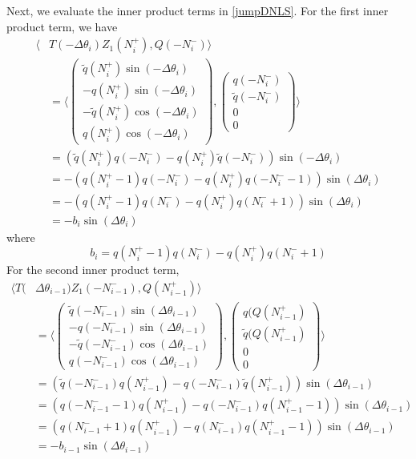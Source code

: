 \documentclass[12pt]{article}
\begin{document}
Next, we evaluate the inner product terms in \eqref{jumpDNLS}. For the first inner product term, we have
\begin{align*}
\langle &T(-\Delta\theta_i) Z_1(N_i^+), Q(-N_i^-) \rangle \\
&= \langle 
\begin{pmatrix}
\tilde{q}(N_i^+)\sin(-\Delta\theta_i) \\
-q(N_i^+)\sin(-\Delta\theta_i) \\ 
-\tilde{q}(N_i^+)\cos(-\Delta\theta_i) \\
q(N_i^+)\cos(-\Delta\theta_i)
\end{pmatrix},
\begin{pmatrix}
q(-N_i^-) \\ \tilde{q}(-N_i^-) \\ 0 \\ 0 
\end{pmatrix}
\rangle \\
&= (\tilde{q}(N_i^+)q(-N_i^-) - q(N_i^+)\tilde{q}(-N_i^-))\sin(-\Delta\theta_i) \\
&= -(q(N_i^+ - 1)q(-N_i^-) - q(N_i^+)q(-N_i^- - 1))\sin(\Delta\theta_i) \\
&= -(q(N_i^+ - 1)q(N_i^-) - q(N_i^+)q(N_i^- + 1))\sin(\Delta\theta_i) \\
&= -b_i \sin(\Delta\theta_i) 
\end{align*}
where 
\[
b_i = q(N_i^+ - 1)q(N_i^-) - q(N_i^+)q(N_i^- + 1)
\]
For the second inner product term,
\begin{align*}
\langle T(&\Delta\theta_{i-1}) Z_1(-N_{i-1}^-), Q(N_{i-1}^+) \rangle \\
&= \langle 
\begin{pmatrix}
\tilde{q}(-N_{i-1}^-)\sin(\Delta\theta_{i-1}) \\
-q(-N_{i-1}^-)\sin(\Delta\theta_{i-1}) \\ 
-\tilde{q}(-N_{i-1}^-)\cos(\Delta\theta_{i-1}) \\
q(-N_{i-1}^-)\cos(\Delta\theta_{i-1})
\end{pmatrix},
\begin{pmatrix}
q(Q(N_{i-1}^+) \\ \tilde{q}(Q(N_{i-1}^+) \\ 0 \\ 0 
\end{pmatrix}
\rangle \\
&= (\tilde{q}(-N_{i-1}^-)q(N_{i-1}^+) - q(-N_{i-1}^-)\tilde{q}(N_{i-1}^+))\sin(\Delta\theta_{i-1}) \\
&= (q(-N_{i-1}^- - 1)q(N_{i-1}^+) - q(-N_{i-1}^-)q(N_{i-1}^+ - 1))\sin(\Delta\theta_{i-1}) \\
&= (q(N_{i-1}^- + 1)q(N_{i-1}^+) - q(N_{i-1}^-)q(N_{i-1}^+ - 1))\sin(\Delta\theta_{i-1}) \\
&= -b_{i-1} \sin(\Delta\theta_{i-1})
\end{align*}
\end{document}
